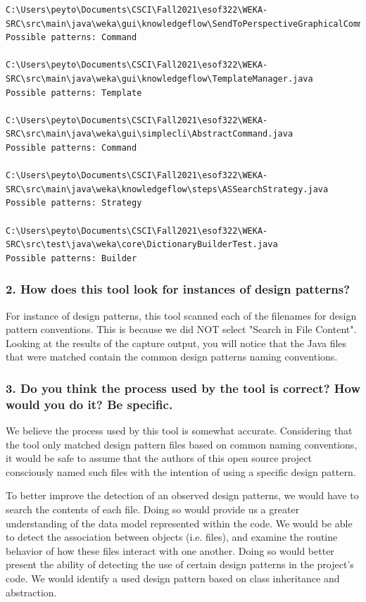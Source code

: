 \documentclass[12pt]{article}
\begin{document}
\begin{lstlisting}
C:\Users\peyto\Documents\CSCI\Fall2021\esof322\WEKA-SRC\src\main\java\weka\gui\knowledgeflow\SendToPerspectiveGraphicalCommand.java
Possible patterns: Command

C:\Users\peyto\Documents\CSCI\Fall2021\esof322\WEKA-SRC\src\main\java\weka\gui\knowledgeflow\TemplateManager.java
Possible patterns: Template

C:\Users\peyto\Documents\CSCI\Fall2021\esof322\WEKA-SRC\src\main\java\weka\gui\simplecli\AbstractCommand.java
Possible patterns: Command

C:\Users\peyto\Documents\CSCI\Fall2021\esof322\WEKA-SRC\src\main\java\weka\knowledgeflow\steps\ASSearchStrategy.java
Possible patterns: Strategy

C:\Users\peyto\Documents\CSCI\Fall2021\esof322\WEKA-SRC\src\test\java\weka\core\DictionaryBuilderTest.java
Possible patterns: Builder
\end{lstlisting}

\subsubsection*{2. How does this tool look for instances of design patterns?}

For instance of design patterns, this tool scanned each of the filenames for design pattern conventions. This is because we did NOT select "Search in File Content". Looking at the results of the capture output, you will notice that the Java files that were matched contain the common design patterns naming conventions.

\subsubsection*{3. Do you think the process used by the tool is correct?  How would you do it? Be specific.}

We believe the process used by this tool is somewhat accurate. Considering that the tool only matched design pattern files based on common naming conventions, it would be safe to assume that the authors of this open source project consciously named such files with the intention of using a specific design pattern.

To better improve the detection of an observed design patterns, we would have to search the contents of each file. Doing so would provide us a greater understanding of the data model represented within the code. We would be able to detect the association between objects (i.e. files), and examine the routine behavior of how these files interact with one another. Doing so would better present the ability of detecting the use of certain design patterns in the project's code. We would identify a used design pattern based on class inheritance and abstraction.
\end{document}
